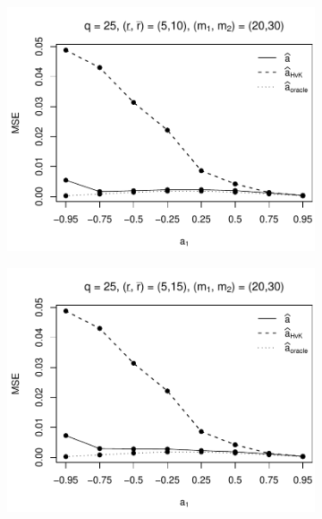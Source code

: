 \begin{figure}[p]
\begin{subfigure}[b]{0.45\textwidth}
\includegraphics[width=\textwidth]{Plots/Plots_Supplement/MSE_a_T=500_slope=10_(L1,L2,K1,K2,M1,M2)=(25,25,5,10,20,30).pdf}
\end{subfigure}
\hspace{0.25cm}
\begin{subfigure}[b]{0.45\textwidth}
\includegraphics[width=\textwidth]{Plots/Plots_Supplement/MSE_a_T=500_slope=10_(L1,L2,K1,K2,M1,M2)=(25,25,5,15,20,30).pdf}
\end{subfigure}


\end{figure}
